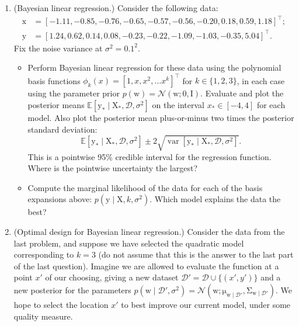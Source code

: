 \documentclass{article}
\newcommand{\given}{\mid}
\newcommand{\mc}[1]{\mathcal{#1}}
\newcommand{\data}{\mc{D}}
\newcommand{\mat}[1]{\bm{\mathrm{#1}}}
\renewcommand{\vec}[1]{\bm{\mathrm{#1}}}
\newcommand{\trans}{^\top}
\DeclareMathOperator{\var}{var}
\begin{document}
\begin{enumerate}
\item
  (Bayesian linear regression.)
  Consider the following data:
  \begin{align*}
    \vec{x}
    &=
    [-1.11, -0.85, -0.76, -0.65, -0.57, -0.56, -0.20, 0.18, 0.59, 1.18]\trans; \\
    \vec{y}
    &=
    [1.24, 0.62, 0.14, 0.08, -0.23, -0.22, -1.09, -1.03, -0.35, 5.04]\trans.
  \end{align*}
  Fix the noise variance at $\sigma^2 = 0.1^2$.
  \begin{itemize}
  \item
    Perform Bayesian linear regression for these data using the
    polynomial basis functions $\phi_k(x) = [1, x, x^2, \dotsc
      x^k]\trans$ for $k \in \{1, 2, 3\}$, in each case using the
    parameter prior $p(\vec{w}) = \mc{N}(\vec{w}; \vec{0}, \mat{I})$.
    Evaluate and plot the posterior means $\mathbb{E}[\vec{y}_\ast
      \given \mat{X}_\ast, \data, \sigma^2]$ on the interval $x_\ast
    \in [-4, 4]$ for each model.  Also plot the posterior mean
    plus-or-minus two times the posterior standard deviation:
    \begin{equation*}
      \mathbb{E}[\vec{y}_\ast \given \mat{X}_\ast, \data, \sigma^2] \pm
      2 \sqrt{\var[\vec{y}_\ast \given \mat{X}_\ast, \data, \sigma^2]}.
    \end{equation*}
    This is a pointwise 95\% credible interval for the regression
    function.  Where is the pointwise uncertainty the largest?
  \item
    Compute the marginal likelihood of the data for each of the basis
    expansions above: $p(\vec{y} \given \mat{X}, k, \sigma^2)$.  Which
    model explains the data the best?
  \end{itemize}

\item
  (Optimal design for Bayesian linear regression.)
  Consider the data from the last problem, and suppose we have
  selected the quadratic model corresponding to $k = 3$ (do not assume
  that this is the answer to the last part of the last question).
  Imagine we are allowed to evaluate the function at a point $x'$ of
  our choosing, giving a new dataset $\data' = \data \cup \bigl\{ (x',
  y') \bigr\}$ and a new posterior for the parameters $p(\vec{w}
  \given \data', \sigma^2) = \mc{N}(\vec{w};
  \vec{\mu}_{\vec{w}\given\data'},
  \mat{\Sigma}_{\vec{w}\given\data'})$.  We hope to select the
  location $x'$ to best improve our current model, under some quality
  measure.


\end{enumerate}
\end{document}

